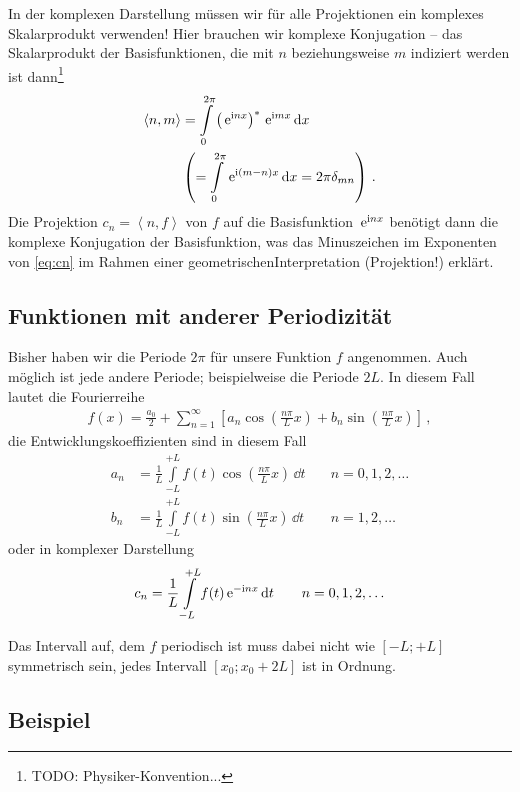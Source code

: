 \documentclass[paper=a4, fontsize=11.0pt, abstractoff, DIV12]{scrartcl}
\begin{document}
\Stopsign\hspace{1ex}In der komplexen Darstellung müssen wir für alle
Projektionen ein komplexes Skalarprodukt verwenden! Hier brauchen wir
komplexe Konjugation -- das Skalarprodukt der Basisfunktionen, die mit $n$
beziehungsweise $m$ indiziert werden ist dann\footnote{TODO: Physiker-Konvention...}
\begin{align}
\left<n,m\right> &= \int\limits_{0}^{2\pi}\left(\,{\mathrm{e}}^{\mathrm{i} nx}\right)^*\,{\mathrm{e}}^{\mathrm{i} mx} \,\mathrm{d} x\\
& \left( =  \int\limits_{0}^{2\pi} \,{\mathrm{e}}^{\mathrm{i} (m-n)x}\,\mathrm{d} x = 2\pi \delta_{mn}\right)\,.\nonumber
\end{align}
Die Projektion $c_n = \left<n,f\right>$ von $f$ auf die Basisfunktion
$\,{\mathrm{e}}^{\mathrm{i} n x}$ benötigt dann die komplexe Konjugation der Basisfunktion,
was das Minuszeichen im Exponenten von \eqref{eq:cn} im Rahmen einer
\glqq geometrischen\grqq Interpretation (Projektion!) erklärt.

\subsection{Funktionen mit anderer Periodizität}

Bisher haben wir die Periode $2\pi$ für unsere Funktion $f$ angenommen. Auch
möglich ist jede andere Periode; beispielweise die Periode $2L$. In diesem Fall
lautet die Fourierreihe
\begin{align}
f(x) = \frac{a_0}{2} + \sum\limits_{n=1}^{\infty}\left[a_n \cos\left(\frac{n\pi}{L}x\right) + b_n \sin\left(\frac{n\pi}{L}x\right)\right]\,,
\end{align}
die Entwicklungskoeffizienten sind in diesem Fall
\begin{align}
a_n &= \frac{1}{L}\int\limits_{-L}^{+L} f(t) \cos\left(\frac{n\pi}{L}x\right)\,\dd t\quad&n=0,1,2,\dots\\
b_n &= \frac{1}{L}\int\limits_{-L}^{+L} f(t) \sin\left(\frac{n\pi}{L}x\right)\,\dd t\quad&n=1,2,\dots
\end{align}
oder in komplexer Darstellung
\begin{align}
c_n = \frac{1}{L}\int\limits_{-L}^{+L} f(t) \,{\mathrm{e}}^{-\mathrm{i} n x}\,\mathrm{d} t\qquad&n=0,1,2,\dots\\
\end{align}

Das Intervall auf, dem $f$ periodisch ist muss dabei nicht wie $[-L;+L]$
symmetrisch sein, jedes Intervall $[x_0; x_0+2L]$ ist in Ordnung.

\subsection{Beispiel}
\end{document}
